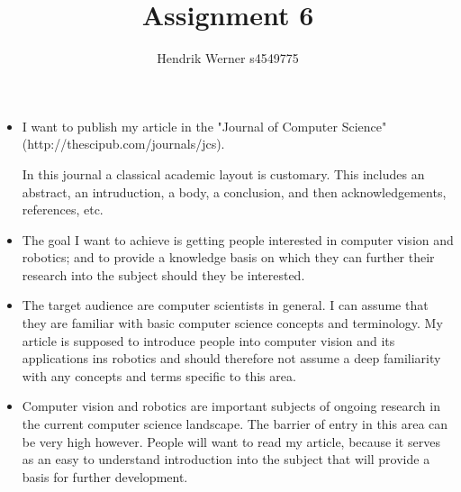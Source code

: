 \documentclass[12pt, a4paper]{article}
\title{Assignment 6}
\author{Hendrik Werner s4549775}
\begin{document}
\maketitle

\begin{itemize}
	\item I want to publish my article in the "Journal of Computer Science" (http://thescipub.com/journals/jcs).

	In this journal a classical academic layout is customary. This includes an abstract, an intruduction, a body, a conclusion, and then acknowledgements, references, etc.
	\item The goal I want to achieve is getting people interested in computer vision and robotics; and to provide a knowledge basis on which they can further their research into the subject should they be interested.
	\item The target audience are computer scientists in general. I can assume that they are familiar with basic computer science concepts and terminology. My article is supposed to introduce people into computer vision and its applications ins robotics and should therefore not assume a deep familiarity with any concepts and terms specific to this area.
	\item Computer vision and robotics are important subjects of ongoing research in the current computer science landscape. The barrier of entry in this area can be very high however. People will want to read my article, because it serves as an easy to understand introduction into the subject that will provide a basis for further development.
\end{itemize}
\end{document}

